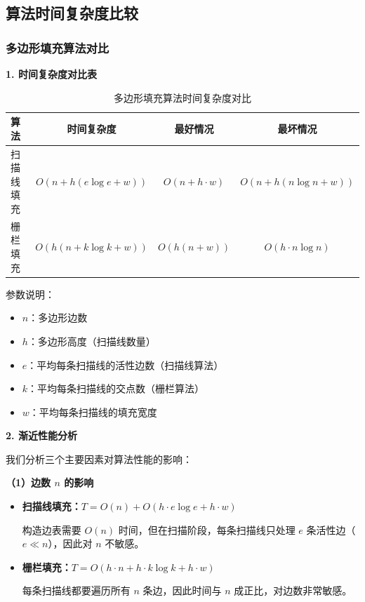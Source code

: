 ﻿\documentclass[12pt,a4paper]{article}
\begin{document}
\subsection{算法时间复杂度比较}

\subsubsection{多边形填充算法对比}

\textbf{1. 时间复杂度对比表}

\begin{table}[H]
\centering
\begin{tabular}{|l|c|c|c|}
\hline
\textbf{算法} & \textbf{时间复杂度} & \textbf{最好情况} & \textbf{最坏情况} \\
\hline
扫描线填充 & $O(n + h(e \log e + w))$ & $O(n + h \cdot w)$ & $O(n + h(n \log n + w))$ \\
\hline
栅栏填充 & $O(h(n + k \log k + w))$ & $O(h(n + w))$ & $O(h \cdot n \log n)$ \\
\hline
\end{tabular}
\caption{多边形填充算法时间复杂度对比}
\end{table}

参数说明：
\begin{itemize}
\item $n$：多边形边数
\item $h$：多边形高度（扫描线数量）
\item $e$：平均每条扫描线的活性边数（扫描线算法）
\item $k$：平均每条扫描线的交点数（栅栏算法）
\item $w$：平均每条扫描线的填充宽度
\end{itemize}

\textbf{2. 渐近性能分析}

我们分析三个主要因素对算法性能的影响：

\textbf{（1）边数 $n$ 的影响}

\begin{itemize}
\item \textbf{扫描线填充：}$T = O(n) + O(h \cdot e \log e + h \cdot w)$
  
  构造边表需要 $O(n)$ 时间，但在扫描阶段，每条扫描线只处理 $e$ 条活性边（$e \ll n$），因此对 $n$ 不敏感。
  
\item \textbf{栅栏填充：}$T = O(h \cdot n + h \cdot k \log k + h \cdot w)$
  
  每条扫描线都要遍历所有 $n$ 条边，因此时间与 $n$ 成正比，对边数非常敏感。
\end{itemize}
\end{document}
